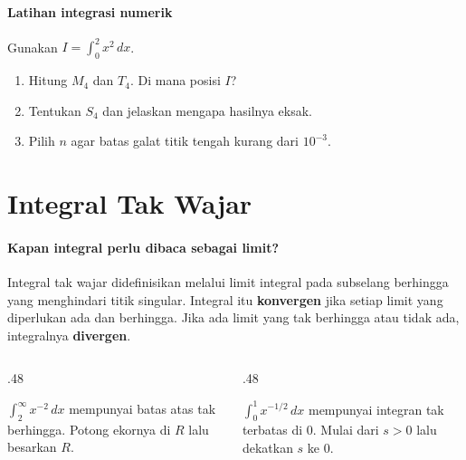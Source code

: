 \documentclass{../../kalkulus-ppt}
\begin{document}
\begin{frame}{\insertsection}
    \framesubtitle{Latihan integrasi numerik}
    \begin{latihan}
        Gunakan $I=\int_0^2 x^2\,dx$.
        \begin{enumerate}
            \item Hitung $M_4$ dan $T_4$. Di mana posisi $I$?
            \item Tentukan $S_4$ dan jelaskan mengapa hasilnya eksak.
            \item Pilih $n$ agar batas galat titik tengah kurang dari $10^{-3}$.
        \end{enumerate}
    \end{latihan}
\end{frame}

\section{Integral Tak Wajar}

\begin{frame}{\insertsection}
    \framesubtitle{Kapan integral perlu dibaca sebagai limit?}
    \begin{definisi}
        Integral tak wajar didefinisikan melalui limit integral pada subselang
        berhingga yang menghindari titik singular. Integral itu \textbf{konvergen}
        jika setiap limit yang diperlukan ada dan berhingga.
        Jika ada limit yang tak berhingga atau tidak ada, integralnya \textbf{divergen}.
    \end{definisi}
    \begin{columns}[t,onlytextwidth]
        \begin{column}{.48\textwidth}
            \begin{contoh}
                $\int_2^\infty x^{-2}\,dx$ mempunyai batas atas tak berhingga.
                Potong ekornya di $R$ lalu besarkan $R$.
            \end{contoh}
        \end{column}
        \begin{column}{.48\textwidth}
            \begin{contoh}
                $\int_0^1 x^{-1/2}\,dx$ mempunyai integran tak terbatas di $0$.
                Mulai dari $s>0$ lalu dekatkan $s$ ke $0$.
            \end{contoh}
        \end{column}
    \end{columns}
\end{frame}
\end{document}
